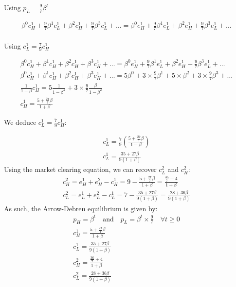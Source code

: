 \documentclass{article}
\begin{document}
Using $p_L=\frac{9}{7}\beta^t$

\begin{gather*}
    \beta^0c_H^1+\frac{9}{7}\beta^1c_L^1+\beta^2c_H^1+\frac{9}{7}\beta^3c_L^1+\hdots=\beta^0e_H^1+\frac{9}{7}\beta^1e_L^1+\beta^2e_H^1+\frac{9}{7}\beta^3e_L^1+\hdots\\
\end{gather*}

Using $c_L^1=\frac{7}{9}c_H^1$

\begin{gather*}
    \beta^0c_H^1+\beta^1c_H^1+\beta^2c_H^1+\beta^3c_H^1+\hdots=\beta^0e_H^1+\frac{9}{7}\beta^1e_L^1+\beta^2e_H^1+\frac{9}{7}\beta^3e_L^1+\hdots\\
    \beta^0c_H^1+\beta^1c_H^1+\beta^2c_H^1+\beta^3c_H^1+\hdots=5\beta^0+3\times\frac{9}{7}\beta^1+5\times\beta^2+3\times\frac{9}{7}\beta^3+\hdots\\
    \frac{1}{1-\beta}c_H^1=5\frac{1}{1-\beta^2}+3\times\frac{9}{7}\frac{\beta}{1-\beta^2}\\
   c_H^1=\frac{5+\frac{27}{7}\beta}{1+\beta}
\end{gather*}

We deduce $c_L^1= \frac{7}{9}c_H^1$:

\begin{gather*}
    c_L^1=\frac{7}{9}\left(\frac{5+\frac{27}{7}\beta}{1+\beta}\right)\\
     c_L^1=\frac{35+27\beta}{9(1+\beta)}
\end{gather*}
Using the market clearing equation, we can recover $c_L^2$ and $c_H^2$:
\begin{gather*}
    c_H^2=e_H^1+e_H^2-c_H^1=9-\frac{5+\frac{27}{7}\beta}{1+\beta}=\frac{\frac{36}{7}+4}{1+\beta}\\
    c_L^2=e_L^1+e_L^2-c_L^1=7-\frac{35+27\beta}{9(1+\beta)}=\frac{28+36\beta}{9(1+\beta)}
\end{gather*}
As such, the Arrow-Debreu equilibrium is given by:
\begin{gather*}
    p_H=\beta^t \quad\mbox{and}\quad p_L=\beta^t\times\frac{9}{7} \quad\forall t\geq0 \\
    c_H^1=\frac{5+\frac{27}{7}\beta}{1+\beta}\\
    c_L^1=\frac{35+27\beta}{9(1+\beta)}\\
    c_H^2=\frac{\frac{36}{7}+4}{1+\beta}\\
    c_L^2=\frac{28+36\beta}{9(1+\beta)}
\end{gather*}

\newpage
\end{document}
